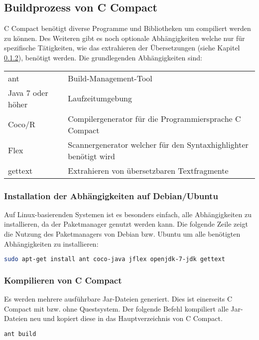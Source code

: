 \subsection{Buildprozess von C Compact}

C Compact ben\"otigt diverse Programme und Bibliotheken um compiliert werden zu k\"onnen. Des Weiteren gibt es noch optionale Abh\"angigkeiten welche nur f\"ur spezifische T\"atigkeiten, wie das extrahieren der \"Ubersetzungen (siehe Kapitel \ref{}), ben\"otigt werden. Die grundlegenden Abh\"angigkeiten sind:

\begin{tabular}{l | l}
 ant & Build-Management-Tool\\
 Java 7 oder h\"oher & Laufzeitumgebung \\
 Coco/R & Compilergenerator f\"ur die Programmiersprache C Compact\\
 Flex & Scannergenerator welcher f\"ur den Syntaxhighlighter ben\"otigt wird\\
 gettext & Extrahieren von \"ubersetzbaren Textfragmente\\
\end{tabular}

\subsubsection{Installation der Abh\"angigkeiten auf Debian/Ubuntu}

Auf Linux-basierenden Systemen ist es besonders einfach, alle Abh\"angigkeiten zu installieren, da der Paketmanager genutzt werden kann. Die folgende Zeile zeigt die Nutzung des Paketmanagers von Debian bzw. Ubuntu um alle ben\"otigten Abh\"angigkeiten zu installieren:

\begin{lstlisting}[language=bash]
sudo apt-get install ant coco-java jflex openjdk-7-jdk gettext
\end{lstlisting}

\subsubsection{Kompilieren von C Compact}

Es werden mehrere ausf\"uhrbare Jar-Dateien generiert. Dies ist einerseits C Compact mit bzw. ohne Questsystem. Der folgende Befehl kompiliert alle Jar-Dateien neu und kopiert diese in das Hauptverzeichnis von C Compact. 

\begin{lstlisting}[language=bash]
ant build
\end{lstlisting}


